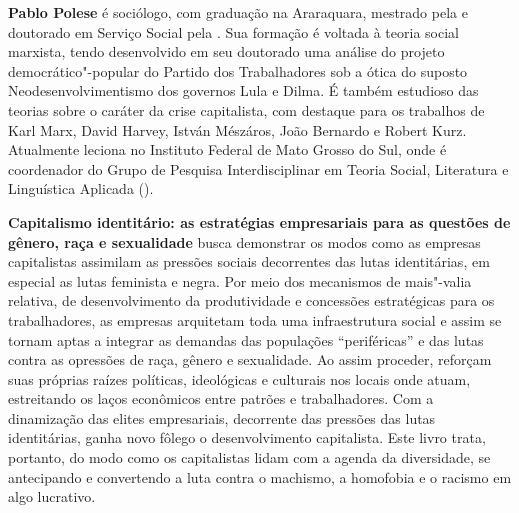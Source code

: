 \textbf{Pablo Polese} é sociólogo, com graduação na  Araraquara, mestrado pela  e doutorado em Serviço Social pela . Sua formação é voltada à teoria social marxista, tendo desenvolvido em seu doutorado uma análise do projeto democrático"-popular do Partido dos Trabalhadores sob a ótica do suposto Neodesenvolvimentismo dos governos Lula e Dilma. É também estudioso das teorias sobre o caráter da crise capitalista, com destaque para os trabalhos de Karl Marx, David Harvey, István Mészáros, João Bernardo e Robert Kurz. Atualmente leciona no Instituto Federal de Mato Grosso do Sul, onde é coordenador do Grupo de Pesquisa Interdisciplinar em Teoria Social, Literatura e Linguística Aplicada (). 



\textbf{Capitalismo identitário: as estratégias empresariais para as questões de gênero, raça e sexualidade} busca demonstrar os modos como as empresas capitalistas assimilam as
pressões sociais decorrentes das lutas identitárias, em especial as
lutas feminista e negra. Por meio dos mecanismos de mais"-valia relativa,
de desenvolvimento da produtividade e concessões estratégicas para os
trabalhadores, as empresas arquitetam toda uma infraestrutura social e
assim se tornam aptas a integrar as demandas das populações
``periféricas'' e das lutas contra as opressões de raça, gênero e
sexualidade. Ao assim proceder, reforçam suas próprias raízes políticas,
ideológicas e culturais nos locais onde atuam, estreitando os laços
econômicos entre patrões e trabalhadores. Com a dinamização das elites
empresariais, decorrente das pressões das lutas identitárias, ganha novo
fôlego o desenvolvimento capitalista. Este livro trata, portanto, do
modo como os capitalistas lidam com a agenda da diversidade, se
antecipando e convertendo a luta contra o machismo, a homofobia e o
racismo em algo lucrativo.

